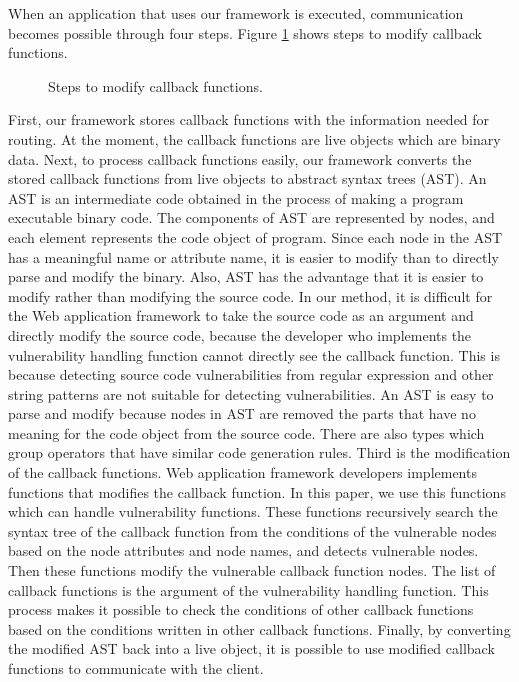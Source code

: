 \documentclass[conference]{IEEEtran}
\begin{document}
When an application that uses our framework is executed, communication becomes possible through four steps.
Figure \ref{fig:4step} shows steps to modify callback functions.
\begin{figure}[htbp]
\caption{Steps to modify callback functions.}
\label{fig:4step}
\end{figure}
First, our framework stores callback functions with the information needed for routing.
At the moment, the callback functions are live objects which are binary data.
Next, to process callback functions easily, our framework converts the stored callback functions from live objects to abstract syntax trees (AST).
An AST is an intermediate code obtained in the process of making a program executable binary code.
The components of AST are represented by nodes, and each element represents the code object of program.
Since each node in the AST has a meaningful name or attribute name, it is easier to modify than to directly parse and modify the binary.
Also, AST has the advantage that it is easier to modify rather than modifying the source code.
In our method, it is difficult for the Web application framework to take the source code as an argument and directly modify the source code, because the developer who implements the vulnerability handling function cannot directly see the callback function.
This is because detecting source code vulnerabilities from regular expression and other string patterns are not suitable for detecting vulnerabilities.
An AST is easy to parse and modify because nodes in AST are removed the parts that have no meaning for the code object from the source code.
There are also types which group operators that have similar code generation rules.
Third is the modification of the callback functions.
Web application framework developers implements functions that modifies the callback function.
In this paper, we use this functions which can handle vulnerability functions.
These functions recursively search the syntax tree of the callback function from the conditions of the vulnerable nodes based on the node attributes and node names, and detects vulnerable nodes.
Then these functions modify the vulnerable callback function nodes.
The list of callback functions is the argument of the vulnerability handling function.
This process makes it possible to check the conditions of other callback functions based on the conditions written in other callback functions.
Finally, by converting the modified AST back into a live object, it is possible to use modified callback functions to communicate with the client.
\end{document}
